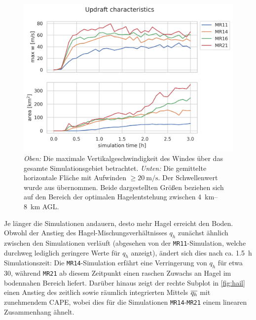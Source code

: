 \begin{figure}
	\centering
	\includegraphics[width=0.9\linewidth]{../figs/updraft.png}
	\caption{\textit{Oben:} Die maximale Vertikalgeschwindigkeit des Windes über das gesamte Simulationsgebiet betrachtet. \textit{Unten:} Die gemittelte horizontale Fläche mit Aufwinden \(\geq \SI{20}{\m\per\s}\). Der Schwellenwert wurde aus \textcite{lin2022} übernommen. Beide dargestellten Größen beziehen sich auf den Bereich der optimalen Hagelentstehung zwischen \SIrange{4}{8}{\km} AGL.}
	\label{fig:updraft}
\end{figure}

Je länger die Simulationen andauern, desto mehr Hagel erreicht den Boden. Obwohl der Anstieg des Hagel-Mischungsverhältnisses \(q_h\) zunächst ähnlich zwischen den Simulationen verläuft (abgesehen von der \texttt{MR11}-Simulation, welche durchweg lediglich geringere Werte für \(q_h\) anzeigt), ändert sich dies nach ca. \SI{1.5}{\hour} Simulationszeit: Die \texttt{MR14}-Simulation erfährt eine Verringerung von \(q_h\) für etwa \SI{30}{\min}, während \texttt{MR21} ab diesem Zeitpunkt einen raschen Zuwachs an Hagel im bodennahen Bereich liefert. Darüber hinaus zeigt der rechte Subplot in \cref{fig:hail} einen Anstieg des zeitlich sowie räumlich integrierten Mittels \(\overline{q_h}\) mit zunehmendem CAPE, wobei dies für die Simulationen \texttt{MR14}-\texttt{MR21} einem linearen Zusammenhang ähnelt.

